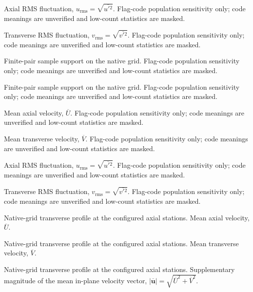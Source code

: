 \caption{Axial RMS fluctuation, $u_{\mathrm{rms}}=\sqrt{\overline{u\prime{}^2}}$. Flag-code population sensitivity only; code meanings are unverified and low-count statistics are masked.}

\caption{Transverse RMS fluctuation, $v_{\mathrm{rms}}=\sqrt{\overline{v\prime{}^2}}$. Flag-code population sensitivity only; code meanings are unverified and low-count statistics are masked.}

\caption{Finite-pair sample support on the native grid. Flag-code population sensitivity only; code meanings are unverified and low-count statistics are masked.}

\caption{Finite-pair sample support on the native grid. Flag-code population sensitivity only; code meanings are unverified and low-count statistics are masked.}

\caption{Mean axial velocity, $\overline{U}$. Flag-code population sensitivity only; code meanings are unverified and low-count statistics are masked.}

\caption{Mean transverse velocity, $\overline{V}$. Flag-code population sensitivity only; code meanings are unverified and low-count statistics are masked.}

\caption{Axial RMS fluctuation, $u_{\mathrm{rms}}=\sqrt{\overline{u\prime{}^2}}$. Flag-code population sensitivity only; code meanings are unverified and low-count statistics are masked.}

\caption{Transverse RMS fluctuation, $v_{\mathrm{rms}}=\sqrt{\overline{v\prime{}^2}}$. Flag-code population sensitivity only; code meanings are unverified and low-count statistics are masked.}

\caption{Native-grid transverse profile at the configured axial stations. Mean axial velocity, $\overline{U}$.}

\caption{Native-grid transverse profile at the configured axial stations. Mean transverse velocity, $\overline{V}$.}

\caption{Native-grid transverse profile at the configured axial stations. Supplementary magnitude of the mean in-plane velocity vector, $|\overline{\mathbf{u}}|=\sqrt{\overline{U}^{2}+\overline{V}^{2}}$.}

